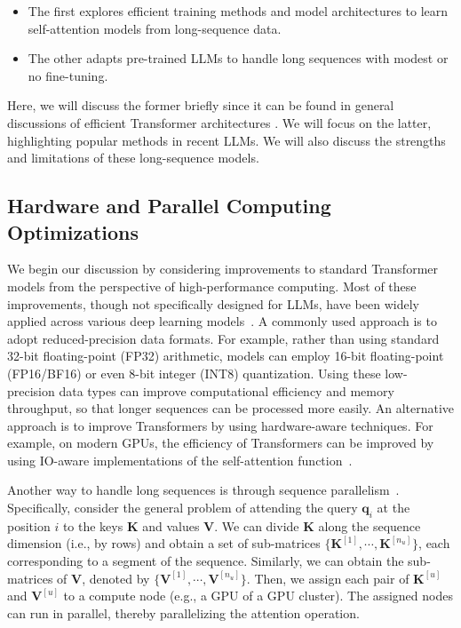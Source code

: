 \begin{itemize}
\item \vspace{0.5em} The first explores efficient training methods and model architectures to learn self-attention models from long-sequence data.
\item \vspace{0.3em} The other adapts pre-trained LLMs to handle long sequences with modest or no fine-tuning.
\end{itemize}
\vspace{0.5em}

Here, we will discuss the former briefly  since it can be found in general discussions of efficient Transformer architectures \cite{Tay-etal:2020efficient,xiao-and-zhu:2023introduction}. We will focus on the latter, highlighting popular methods in recent LLMs. We will also discuss the strengths and limitations of these long-sequence models.

\subsection{Hardware and Parallel Computing Optimizations}

\noindent We begin our discussion by considering improvements to standard Transformer models from the perspective of high-performance computing. Most of these improvements, though not specifically designed for LLMs, have been widely applied across various deep learning models~\cite{kim-etal:2023full}. A commonly used approach is to adopt reduced-precision data formats. For example, rather than using standard 32-bit floating-point (FP32) arithmetic, models can employ 16-bit floating-point (FP16/BF16) or even 8-bit integer (INT8) quantization. Using these low-precision data types can improve computational efficiency and memory throughput, so that longer sequences can be processed more easily. An alternative approach is to improve Transformers by using hardware-aware techniques. For example, on modern GPUs, the efficiency of Transformers can be improved by using IO-aware implementations of the self-attention function~\cite{dao-etal:2022flashattention,kwon-etal:2023efficient}.

Another way to handle long sequences is through sequence parallelism~\cite{li-etal:2023sequence,korthikanti-etal:2023reducing}. Specifically, consider the general problem of attending the query $\mathbf{q}_i$ at the position $i$ to the keys $\mathbf{K}$ and values $\mathbf{V}$. We can divide $\mathbf{K}$ along the sequence dimension (i.e., by rows) and obtain a set of sub-matrices $\{\mathbf{K}^{[1]},\cdots,\mathbf{K}^{[n_u]}\}$, each corresponding to a segment of the sequence. Similarly, we can obtain the sub-matrices of $\mathbf{V}$, denoted by $\{\mathbf{V}^{[1]},\cdots,\mathbf{V}^{[n_u]}\}$. Then, we assign each pair of $\mathbf{K}^{[u]}$ and $\mathbf{V}^{[u]}$ to a compute node (e.g., a GPU of a GPU cluster). The assigned nodes can run in parallel, thereby parallelizing the attention operation.

